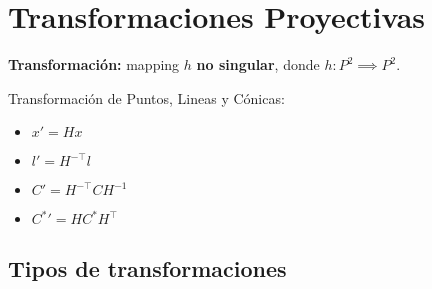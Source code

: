 \documentclass[12pt,a4paper]{article}
\begin{document}
\section{Transformaciones Proyectivas}

{\bf Transformaci\'on:} mapping $h$ {\bf no singular}, donde $h:P^{2} \implies P^{2}$.

Transformaci\'on de Puntos, Lineas y C\'onicas:

\begin{itemize}
	\item $x'= H x$

	\item $l'= H^{-\top} l$

	\item $C'= H^{-\top} C H^{-1}$

	\item ${C^{*}}'= H C^{*} H^{\top}$
\end{itemize}

\subsection{Tipos de transformaciones}
\end{document}
